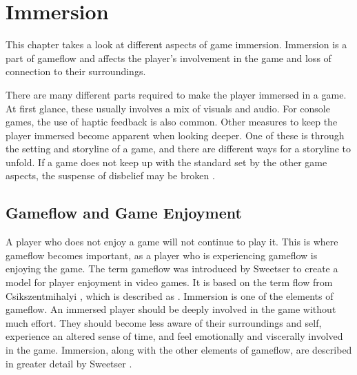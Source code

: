 \chapter{Immersion}
\label{ch:immersion}

This chapter takes a look at different aspects of game immersion.
Immersion is a part of gameflow \cite{sweetser2005gameflow} and affects the player's involvement in the game and loss of connection to their surroundings.

There are many different parts required to make the player immersed in a game.
At first glance, these usually involves a mix of visuals and audio.
For console games, the use of haptic feedback is also common.
Other measures to keep the player immersed become apparent when looking deeper.
One of these is through the setting and storyline of a game, and there are different ways for a storyline to unfold.
If a game does not keep up with the standard set by the other game aspects, the suspense of disbelief may be broken \cite{overmars2012}.



\section{Gameflow and Game Enjoyment}
\label{immersionGameflow}
A player who does not enjoy a game will not continue to play it.
This is where gameflow becomes important, as a player who is experiencing gameflow is enjoying the game.
The term gameflow was introduced by Sweetser \cite{sweetser2005gameflow} to create a model for player enjoyment in video games.
It is based on the term flow from Csikszentmihalyi \cite{csikszentmihalyi1991flow}, which is described as .
Immersion is one of the elements of gameflow.
An immersed player should be deeply involved in the game without much effort.
They should become less aware of their surroundings and self, experience an altered sense of time, and feel emotionally and viscerally involved in the game.
Immersion, along with the other elements of gameflow, are described in greater detail by Sweetser \cite{sweetser2005gameflow}.

